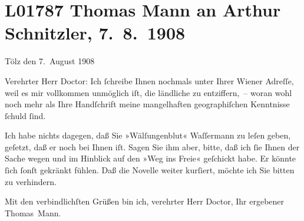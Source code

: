 

\section[Thomas Mann an Arthur Schnitzler, 7. 8. 1908]{L01787 Thomas Mann an Arthur Schnitzler, 7. 8. 1908}
\nopagebreak{}
\rehead{ }\normalsize\beginnumbering{}
\toendnotes[C]{\smallbreak\pagebreak[2]}
\toendnotes[C]{\smallbreak}
\pstart
           {\pb}Tölz den 7. August 1908\pend
           
\pstart{}Verehrter Herr Doctor:\pend\vspace{0.5em}
\pstart
           Ich ſchreibe Ihnen nochmals unter Ihrer Wiener
               Adreſſe, weil es mir vollkommen unmöglich iſt, die ländliche zu entziffern, – woran
               wohl noch mehr als Ihre Handſchrift meine mangelhaften geographiſchen Kenntnisse
               ſchuld ſind.\pend
           
\pstart
           Ich habe nichts dagegen, daß Sie {\pb}»Wälſungenblut« Waſſermann zu leſen geben, geſetzt, daß er noch bei Ihnen iſt. Sagen Sie ihm
               aber, bitte, daß ich ſie Ihnen der Sache wegen und im Hinblick auf den »Weg ins Freie« geſchickt habe. Er könnte ſich
               ſonſt gekränkt fühlen. Daß die Novelle weiter kurſiert, möchte ich Sie bitten zu verhindern.\pend
           
\pstart
           Mit den verbindlichſten Grüßen bin ich, verehrter Herr Doctor, Ihr ergebener\pend
           \pstart \spacefill\mbox{Thomas Mann.}\pend{}\endnumbering{}  
      